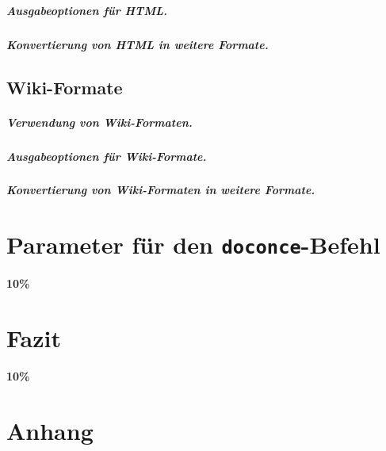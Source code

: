 \documentclass[%
oneside,                 %
final,                   %
chapterprefix=true,      %
open=right,              %
10pt]{book}
\begin{document}
\paragraph{ Ausgabeoptionen für HTML.}
\paragraph{ Konvertierung von HTML in weitere Formate.}
\section{Wiki-Formate}
\paragraph{ Verwendung von Wiki-Formaten.}
\paragraph{ Ausgabeoptionen für Wiki-Formate.}
\paragraph{ Konvertierung von Wiki-Formaten in weitere Formate.}
\chapter{Parameter für den \texttt{doconce}-Befehl}
\textbf{10\%}
\chapter{Fazit}
\textbf{10\%}
\chapter{Anhang}
\end{document}
